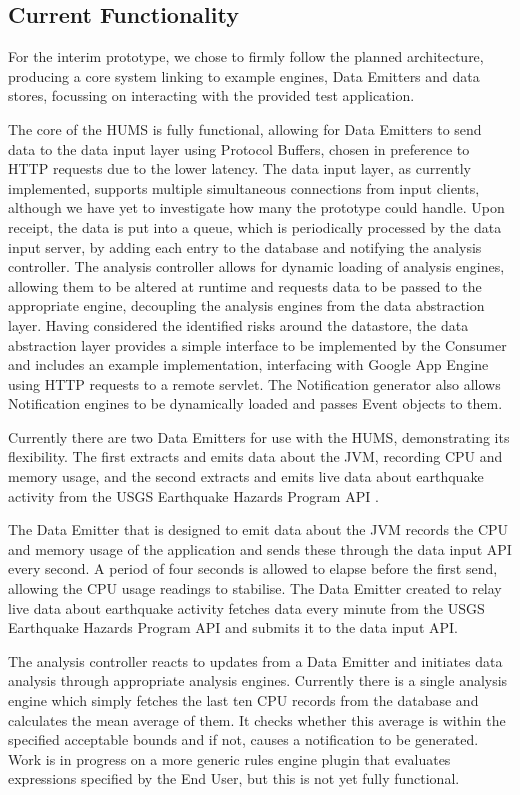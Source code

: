 \documentclass[10pt,a4paper]{article}
\begin{document}
\subsection{Current Functionality}
For the interim prototype, we chose to firmly follow the planned architecture, producing a core system linking to example engines, Data Emitters and data stores, focussing on interacting with the provided test application.

The core of the HUMS is fully functional, allowing for Data Emitters to send data to the data input layer using Protocol Buffers, chosen in preference to HTTP requests due to the lower latency. The data input layer, as currently 
implemented, supports multiple simultaneous connections from input clients, although we have yet to investigate how many the prototype could handle. Upon receipt, the data is put into a queue, which is periodically processed by the data input server, by adding each entry to the database and notifying the analysis controller. The analysis controller allows for dynamic loading of analysis engines, allowing them to be altered at runtime and requests data to be passed to the appropriate engine, decoupling the analysis engines from the data abstraction layer. Having considered the identified risks around the datastore, the data abstraction layer provides a simple interface to be implemented by the Consumer and includes an example implementation, interfacing with Google App Engine using HTTP requests to a remote servlet. The Notification generator also allows Notification engines to be dynamically loaded and passes Event objects to them.

Currently there are two Data Emitters for use with the HUMS, demonstrating its flexibility. The first extracts and emits data about the JVM, recording CPU and memory usage, and the second extracts and emits live data about earthquake activity from the USGS Earthquake Hazards Program API \cite{usgs}.

The Data Emitter that is designed to emit data about the JVM records the CPU and memory usage of the application and sends these through the data input API every second. A period of four seconds is allowed to elapse before the first send, allowing the CPU usage readings to stabilise. The Data Emitter created to relay live data about earthquake activity fetches data every minute from the USGS Earthquake Hazards Program API and submits it to the data input API.

The analysis controller reacts to updates from a Data Emitter and initiates
data analysis through appropriate analysis engines. Currently
there is a single analysis engine which simply fetches the last ten CPU records from the database and calculates the mean average of them. It checks whether this average is within the specified acceptable bounds and if not, causes a notification to be generated. Work is in progress on a more generic rules engine plugin that evaluates expressions specified by the End User, but this is not yet fully functional.
\end{document}
